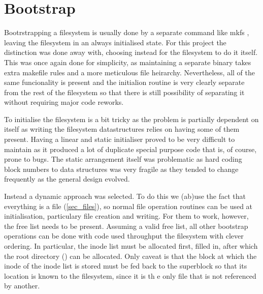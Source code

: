    \section{Bootstrap}

        Bootrstrapping a filesystem is usually done by a separate command like
        mkfs \cite{man mkfs}, leaving the filesystem in an always initialised
        state. For this project the distinction was done away with, choosing
        instead for the filesystem to do it itself. This was once again done
        for simplicity, as maintaining a separate binary takes extra makefile
        rules and a more meticulous file heirarchy. Nevertheless, all of the
        same funcionality is present and the initialion routine is very clearly
        separate from the rest of the filesystem so that there is still
        possibility of separating it without requiring major code reworks.

        To initialise the filesystem is a bit tricky as the problem is
        partially dependent on itself as writing the filesystem datastructures
        relies on having some of them present. Having a linear and static
        initialiser proved to be very difficult to maintain as it produced a
        lot of duplicate special purpose code that is, of course, prone to
        bugs. The static arrangement itself was problematic as hard coding
        block numbers to data structures was very fragile as they tended to
        change frequently as the general design evolved.

        Instead a dynamic approach was selected. To do this we (ab)use the fact
        that everything is a file (\ref{sec_files}), so normal file operation
        routines can be used at initialisation, particulary file creation and
        writing. For them to work, however, the free list needs to be present.
        Assuming a valid free list, all other bootstrap operations can be done
        with code used throughput the filesystem with clever ordering. In
        particular, the inode list must be allocated first, filled in, after
        which the root directory (\monospace{/}) can be allocated. Only caveat is
        that the block at which the inode of the inode list is stored must be
        fed back to the superblock so that its location is known to the
        filesystem, since it is th e only file that is not referenced by
        another.

